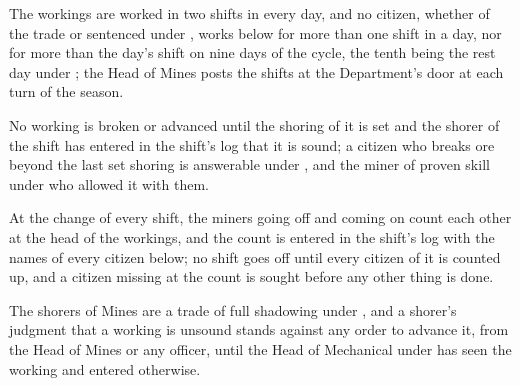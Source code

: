 \begin{clauses}
\item The workings are worked in two shifts in every day, and no citizen, whether of the trade or sentenced under , works below for more than one shift in a day, nor for more than the day's shift on nine days of the cycle, the tenth being the rest day under ; the Head of Mines posts the shifts at the Department's door at each turn of the season.
\item No working is broken or advanced until the shoring of it is set and the shorer of the shift has entered in the shift's log that it is sound; a citizen who breaks ore beyond the last set shoring is answerable under , and the miner of proven skill under  who allowed it with them.
\item At the change of every shift, the miners going off and coming on count each other at the head of the workings, and the count is entered in the shift's log with the names of every citizen below; no shift goes off until every citizen of it is counted up, and a citizen missing at the count is sought before any other thing is done.
\item The shorers of Mines are a trade of full shadowing under , and a shorer's judgment that a working is unsound stands against any order to advance it, from the Head of Mines or any officer, until the Head of Mechanical under  has seen the working and entered otherwise.
\end{clauses}

